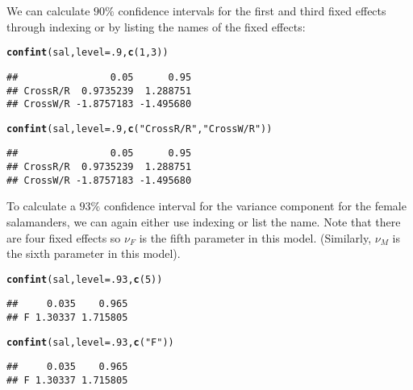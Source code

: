 \documentclass[11pt]{article}\usepackage[]{graphicx}\usepackage[]{color}
\makeatletter
\newcommand{\hlnum}[1]{\textcolor[rgb]{0.686,0.059,0.569}{#1}}%
\newcommand{\hlstr}[1]{\textcolor[rgb]{0.192,0.494,0.8}{#1}}%
\newcommand{\hlstd}[1]{\textcolor[rgb]{0.345,0.345,0.345}{#1}}%
\newcommand{\hlkwc}[1]{\textcolor[rgb]{0.333,0.667,0.333}{#1}}%
\newcommand{\hlkwd}[1]{\textcolor[rgb]{0.737,0.353,0.396}{\textbf{#1}}}%
\newenvironment{kframe}{%
 \def\at@end@of@kframe{}%
 \ifinner\ifhmode%
  \def\at@end@of@kframe{\end{minipage}}%
  \begin{minipage}{\columnwidth}%
 \fi\fi%
 \def\FrameCommand##1{\hskip\@totalleftmargin \hskip-\fboxsep
 \colorbox{shadecolor}{##1}\hskip-\fboxsep
     \hskip-\linewidth \hskip-\@totalleftmargin \hskip\columnwidth}%
 \MakeFramed {\advance\hsize-\width
   \@totalleftmargin\z@ \linewidth\hsize
   \@setminipage}}%
 {\par\unskip\endMakeFramed%
 \at@end@of@kframe}
\newenvironment{knitrout}{}{} %
\makeatother
\begin{document}
We can calculate $90\%$ confidence intervals for the first and third fixed effects through indexing or by listing the names of the fixed effects:\\
\begin{knitrout}
\color{fgcolor}\begin{kframe}
\begin{alltt}
\hlkwd{confint}\hlstd{(sal,}\hlkwc{level}\hlstd{=}\hlnum{.9}\hlstd{,}\hlkwd{c}\hlstd{(}\hlnum{1}\hlstd{,}\hlnum{3}\hlstd{))}
\end{alltt}
\begin{verbatim}
##                0.05      0.95
## CrossR/R  0.9735239  1.288751
## CrossW/R -1.8757183 -1.495680
\end{verbatim}
\begin{alltt}
\hlkwd{confint}\hlstd{(sal,}\hlkwc{level}\hlstd{=}\hlnum{.9}\hlstd{,}\hlkwd{c}\hlstd{(}\hlstr{"CrossR/R"}\hlstd{,}\hlstr{"CrossW/R"}\hlstd{))}
\end{alltt}
\begin{verbatim}
##                0.05      0.95
## CrossR/R  0.9735239  1.288751
## CrossW/R -1.8757183 -1.495680
\end{verbatim}
\end{kframe}
\end{knitrout}

To calculate a $93\%$ confidence interval for the variance component for the female salamanders, we can again either use indexing or list the name. Note that there are four fixed effects so $\nu_F$ is the fifth parameter in this model. (Similarly, $\nu_M$ is the sixth parameter in this model).\\
\begin{knitrout}
\color{fgcolor}\begin{kframe}
\begin{alltt}
\hlkwd{confint}\hlstd{(sal,}\hlkwc{level}\hlstd{=}\hlnum{.93}\hlstd{,}\hlkwd{c}\hlstd{(}\hlnum{5}\hlstd{))}
\end{alltt}
\begin{verbatim}
##     0.035    0.965
## F 1.30337 1.715805
\end{verbatim}
\begin{alltt}
\hlkwd{confint}\hlstd{(sal,}\hlkwc{level}\hlstd{=}\hlnum{.93}\hlstd{,}\hlkwd{c}\hlstd{(}\hlstr{"F"}\hlstd{))}
\end{alltt}
\begin{verbatim}
##     0.035    0.965
## F 1.30337 1.715805
\end{verbatim}
\end{kframe}
\end{knitrout}
\end{document}
